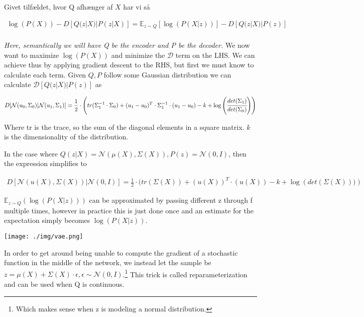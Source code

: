 \documentclass[12pt,a4paper]{report}
\begin{document}
Givet tilfældet, hvor Q afhænger af \(X\) har vi så

\setcounter{equation}{0}
\begin{align*}
\log(P(X))- D[Q(z|X)| P(z|X)] = \mathbb{E}_{z \sim Q} [\log(P(X|z))] - D[Q(z|X)|P(z)]\\
\end{align*}

\emph{Here, semantically we will have Q be the encoder and P be the decoder.}
We now want to maximize \(\log(P(X))\) and minimize the \(\mathcal{D}\) term on the LHS.
We can achieve thus by applying gradient descent to the RHS, but first we must know to calculate each term. 
Given \(Q,P\) follow some Gaussian distribution we can calculate \(\mathcal{D}[Q(z|X)|P(z)]\) as

\setcounter{equation}{0}
\begin{align*}
D[\mathcal{N}(u_{0},\Sigma_{0})|\mathcal{N}(u_{1},\Sigma_{1})] = 
\frac{1}{2} \cdot \left(tr(\Sigma_{1}^{-1} \cdot \Sigma_{0}) + (u_{1}-u_{0})^{T} \cdot \Sigma_{1}^{-1} \cdot (u_{1}- u_{0}) - k + \log\left(\cfrac{det (\Sigma_{1})}{det(\Sigma_{0})}\right)\right)
\end{align*}

Where tr is the trace, so the sum of the diagonal elements in a square matrix.
\(k\) is the dimensionality of the distribution.
\\ \vspace{0.3cm}

In the case where \(Q(z|X) = \mathcal{N}(\mu(X),\Sigma(X)), P(z) = \mathcal{N}(0,I)\), then the expression simplifies to

\setcounter{equation}{0}
\begin{align*}
D[\mathcal{N}(u(X),\Sigma(X))|\mathcal{N}(0,I)] = 
\frac{1}{2} \cdot (tr(\Sigma(X)) + (u(X))^{T} \cdot (u(X)) - k + \log\left(det(\Sigma(X)))\right)
\end{align*}

\(\mathbb{E}_{z\sim Q}(\log(P(X|z)))\) can be approximated by passing different z through f multiple times, however in practice this is just done once and an estimate for the expectation simply becomes \(\log(P(X|z))\).

\begin{center}
\texttt{[image: ./img/vae.png]}
\end{center}

In order to get around being unable to compute the gradient of a stochastic function in the middle of the network, we instead let the sample be \(z = \mu(X) + \Sigma(X) \cdot \epsilon, \epsilon \sim \mathcal{N}(0,I)\).\footnote{Which makes sense when z is modeling a normal distribution.}
This trick is called reparameterization and can be used when Q is continuous. 
\\ \vspace{0.3cm}
\end{document}
